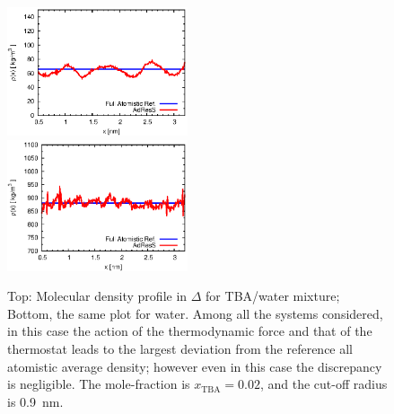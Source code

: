 \documentclass[a4paper,preprint,unsortedaddress]{revtex4-1}
\newcommand{\concenttba}{x_{\textrm{TBA}}}
\begin{document}
\begin{figure}
\center
\includegraphics[width=0.475\textwidth]{alcohol_rho.eps}\\
\includegraphics[width=0.475\textwidth]{water_rho.eps}
\caption{Top: Molecular density profile in $\Delta$ for TBA/water mixture; Bottom, the same plot for water.
  Among all the systems considered, in this case the action of the thermodynamic force and that of the thermostat leads to the largest deviation from the reference all atomistic average density;
  however even in this case the discrepancy is negligible. The mole-fraction is $\concenttba=0.02$, and the cut-off radius is 0.9~nm.}
\label{urea-TBA}
\end{figure}
\end{document}
